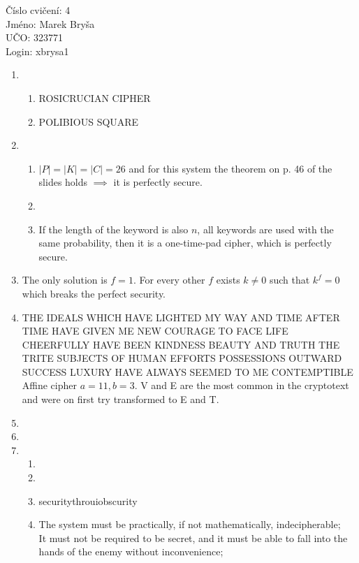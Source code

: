 \documentclass[a4paper,10pt]{extarticle}
\begin{document}
\begin{flushleft}
Číslo cvičení: 4 \\ 
Jméno: Marek Bryša \\
UČO: 323771\\
Login: xbrysa1\\
\end{flushleft}
\begin{enumerate}
  \item
    \begin{enumerate}
      \item
        ROSICRUCIAN CIPHER
      \item
        POLIBIOUS SQUARE
    \end{enumerate}
  \item
    \begin{enumerate}
      \item 
        $|P|=|K|=|C|=26$ and for this system the theorem on p. 46 of the slides holds $\implies$ it is perfectly secure.
      \item
      \item
        If the length of the keyword is also $n$, all keywords are used with the same probability, then it is a one-time-pad cipher, which is perfectly secure.
    \end{enumerate}
  \item
    The only solution is $f=1$. For every other $f$ exists $k\neq0$ such that $k^f=0$ which breaks the perfect security.
  \item
    THE IDEALS WHICH HAVE LIGHTED MY WAY AND TIME AFTER TIME HAVE GIVEN ME NEW COURAGE TO FACE LIFE CHEERFULLY HAVE BEEN KINDNESS BEAUTY AND TRUTH THE TRITE SUBJECTS OF HUMAN EFFORTS POSSESSIONS OUTWARD SUCCESS LUXURY HAVE ALWAYS SEEMED TO ME CONTEMPTIBLE\\
    Affine cipher $a=11, b=3$. V and E are the most common in the cryptotext and were on first try transformed to E and T.
  \item
  \item
  \item
    \begin{enumerate}
      \item
      \item
      \item
        securitythrouiobscurity
      \item
        The system must be practically, if not mathematically, indecipherable;\\
        It must not be required to be secret, and it must be able to fall into the hands of the enemy without inconvenience;\\

\end{enumerate}
\end{enumerate}
\end{document}
